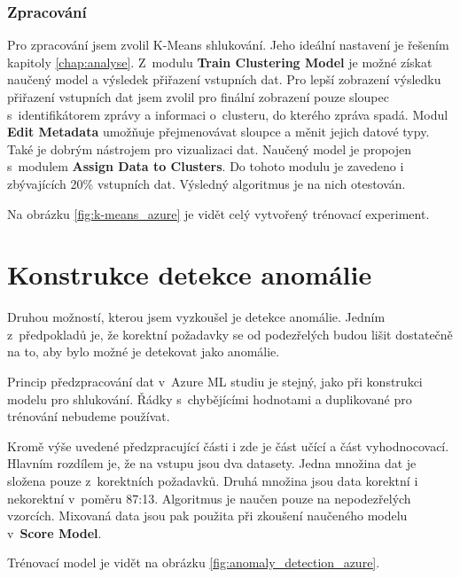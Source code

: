 \documentclass[thesis=M,czech]{FITthesis}[2012/10/20]
\begin{document}
		\subsubsection{Zpracování}
		Pro zpracování jsem zvolil K-Means shlukování. Jeho ideální nastavení je řešením kapitoly \ref{chap:analyse}. Z~modulu \textbf{Train Clustering Model} je možné získat naučený model a výsledek přiřazení vstupních dat. Pro lepší zobrazení výsledku přiřazení vstupních dat jsem zvolil pro finální zobrazení pouze sloupec s~identifikátorem zprávy a informaci o~clusteru, do kterého zpráva spadá. Modul \textbf{Edit Metadata} umožňuje přejmenovávat sloupce a měnit jejich datové typy. Také je dobrým nástrojem pro vizualizaci dat. Naučený model je propojen s~modulem \textbf{Assign Data to Clusters}. Do tohoto modulu je zavedeno i zbývajících 20\% vstupních dat. Výsledný algoritmus je na nich otestován.
		
		Na obrázku \ref{fig:k-means_azure} je vidět celý vytvořený trénovací experiment.
	
	\section{Konstrukce detekce anomálie}
		\label{sec:construc_anomaly}
		Druhou možností, kterou jsem vyzkoušel je detekce anomálie. Jedním z~předpokladů je, že korektní požadavky se od podezřelých budou lišit dostatečně na to, aby bylo možné je detekovat jako anomálie.
		
		Princip předzpracování dat v~Azure ML studiu je stejný, jako při konstrukci modelu pro shlukování. Řádky s~chybějícími hodnotami a duplikované pro trénování nebudeme používat.
		
		Kromě výše uvedené předzpracující části i zde je část učící a část vyhodnocovací. Hlavním rozdílem je, že na vstupu jsou dva datasety. Jedna množina dat je složena pouze z~korektních požadavků. Druhá množina jsou data korektní i nekorektní v~poměru 87:13. Algoritmus je naučen pouze na nepodezřelých vzorcích. Mixovaná data jsou pak použita při zkoušení naučeného modelu v~\textbf{Score Model}.
		
		Trénovací model je vidět na obrázku \ref{fig:anomaly_detection_azure}.
		
\end{document}
